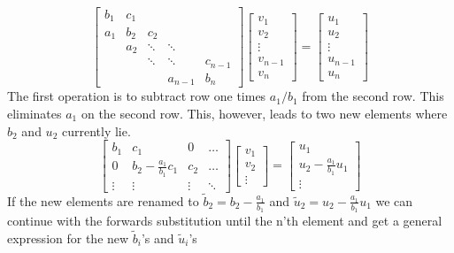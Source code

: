\documentclass[10pt,a4paper]{article}
\begin{document}
    \[
    \begin{bmatrix}
    b_1 & c_1 &  &  &  \\
    a_1 & b_2 & c_2 &  &  \\
    & a_2 & \ddots & \ddots &  \\
    &  & \ddots & \ddots & c_{n-1} \\
    &  &  & a_{n-1} & b_n
    \end{bmatrix}
    \begin{bmatrix}
	    v_1 \\
	    v_2 \\
	    \vdots \\
	    v_{n-1} \\
	    v_n
    \end{bmatrix} =
    \begin{bmatrix}
	    u_1 \\
	    u_2 \\
	    \vdots \\
	    u_{n-1} \\
	    u_n
    \end{bmatrix}
    \]
    The first operation is to subtract row one times $a_1/b_1$ from the second row. This eliminates $a_1$ on the second row. This, however, leads to two new elements where $b_2$ and $u_2$ currently lie.
    \[
    \begin{bmatrix}
        b_1 & c_1 & 0 & \dots\\
        0 & b_2-\tfrac{a_1}{b_1}c_1 & c_2 & \dots\\
        \vdots & \vdots & \vdots & \ddots
    \end{bmatrix}
    \begin{bmatrix}
        v_1\\
        v_2\\
        \vdots
    \end{bmatrix}
    =
    \begin{bmatrix}
        u_1\\
        u_2-\tfrac{a_1}{b_1}u_1\\
        \vdots
    \end{bmatrix}
    \]
    If the new elements are renamed to $\tilde{b}_2 = b_2-\tfrac{a_1}{b_1} $ and $\tilde{u}_2 = u_2-\tfrac{a_1}{b_1}u_1$ we can continue with the forwards substitution until the n'th element and get a general expression for the new $\tilde{b}_i$'s and $\tilde{u}_i$'s
\end{document}
